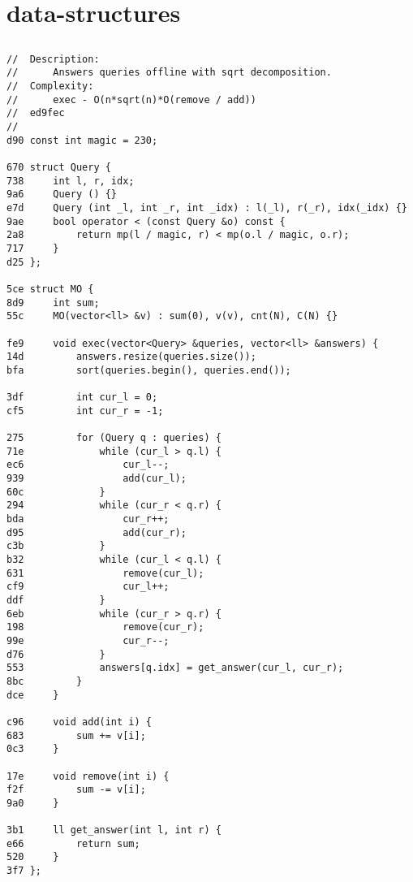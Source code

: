 \documentclass[11pt, a4paper, twoside]{article}
\begin{document}
\section{data-structures}

\subsection{}
\begin{lstlisting}
//  Description: 
//      Answers queries offline with sqrt decomposition.
//  Complexity: 
//      exec - O(n*sqrt(n)*O(remove / add))
//  ed9fec
//
d90 const int magic = 230;

670 struct Query {
738     int l, r, idx;
9a6     Query () {}
e7d     Query (int _l, int _r, int _idx) : l(_l), r(_r), idx(_idx) {}
9ae     bool operator < (const Query &o) const {
2a8         return mp(l / magic, r) < mp(o.l / magic, o.r);
717     }
d25 };

5ce struct MO {
8d9     int sum;
55c     MO(vector<ll> &v) : sum(0), v(v), cnt(N), C(N) {}
    
fe9     void exec(vector<Query> &queries, vector<ll> &answers) {
14d         answers.resize(queries.size());
bfa         sort(queries.begin(), queries.end());
    
3df         int cur_l = 0;
cf5         int cur_r = -1;
    
275         for (Query q : queries) {
71e             while (cur_l > q.l) {
ec6                 cur_l--;
939                 add(cur_l);
60c             }
294             while (cur_r < q.r) {
bda                 cur_r++;
d95                 add(cur_r);
c3b             }
b32             while (cur_l < q.l) {
631                 remove(cur_l);
cf9                 cur_l++;
ddf             }
6eb             while (cur_r > q.r) {
198                 remove(cur_r);
99e                 cur_r--;
d76             }
553             answers[q.idx] = get_answer(cur_l, cur_r);
8bc         }
dce     }
    
c96     void add(int i) {
683         sum += v[i];
0c3     }
    
17e     void remove(int i) {
f2f         sum -= v[i];
9a0     }
    
3b1     ll get_answer(int l, int r) {
e66         return sum;
520     }
3f7 };
\end{lstlisting}
\end{document}
